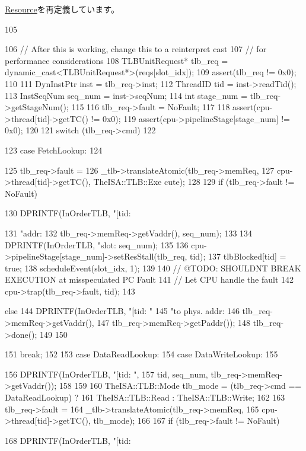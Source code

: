 \hyperlink{classResource_a39af49c5568d1db3f53c12d7d6914c32}{Resource}を再定義しています。


\begin{DoxyCode}
105 {
106     // After this is working, change this to a reinterpret cast
107     // for performance considerations
108     TLBUnitRequest* tlb_req = dynamic_cast<TLBUnitRequest*>(reqs[slot_idx]);
109     assert(tlb_req != 0x0);
110 
111     DynInstPtr inst = tlb_req->inst;
112     ThreadID tid = inst->readTid();
113     InstSeqNum seq_num = inst->seqNum;
114     int stage_num = tlb_req->getStageNum();
115 
116     tlb_req->fault = NoFault;
117 
118     assert(cpu->thread[tid]->getTC() != 0x0);
119     assert(cpu->pipelineStage[stage_num] != 0x0);
120 
121     switch (tlb_req->cmd)
122     {
123       case FetchLookup:
124         {
125             tlb_req->fault =
126                 _tlb->translateAtomic(tlb_req->memReq,
127                                       cpu->thread[tid]->getTC(), TheISA::TLB::Exe
      cute);
128 
129             if (tlb_req->fault != NoFault) {
130                 DPRINTF(InOrderTLB, "[tid:%
      
131                         "addr:%
132                         tlb_req->memReq->getVaddr(), seq_num);
133 
134                 DPRINTF(InOrderTLB, "slot:%
      seq_num);
135 
136                 cpu->pipelineStage[stage_num]->setResStall(tlb_req, tid);
137                 tlbBlocked[tid] = true;
138                 scheduleEvent(slot_idx, 1);
139 
140                 // @TODO: SHOULDNT BREAK EXECUTION at misspeculated PC Fault
141                 // Let CPU handle the fault
142                 cpu->trap(tlb_req->fault, tid);
143             } else {
144                 DPRINTF(InOrderTLB, "[tid:%
       "
145                         "to phys. addr:%
146                         tlb_req->memReq->getVaddr(),
147                         tlb_req->memReq->getPaddr());
148                 tlb_req->done();
149             }
150         }
151         break;
152 
153       case DataReadLookup:
154       case DataWriteLookup:
155         {
156             DPRINTF(InOrderTLB, "[tid:%
      \n",
157                     tid, seq_num, tlb_req->memReq->getVaddr());
158 
159 
160             TheISA::TLB::Mode tlb_mode = (tlb_req->cmd == DataReadLookup) ?
161                 TheISA::TLB::Read : TheISA::TLB::Write;
162 
163             tlb_req->fault =
164                 _tlb->translateAtomic(tlb_req->memReq,
165                                       cpu->thread[tid]->getTC(), tlb_mode);
166 
167             if (tlb_req->fault != NoFault) {
168                 DPRINTF(InOrderTLB, "[tid:%
      
}}}}
\end{DoxyCode}
